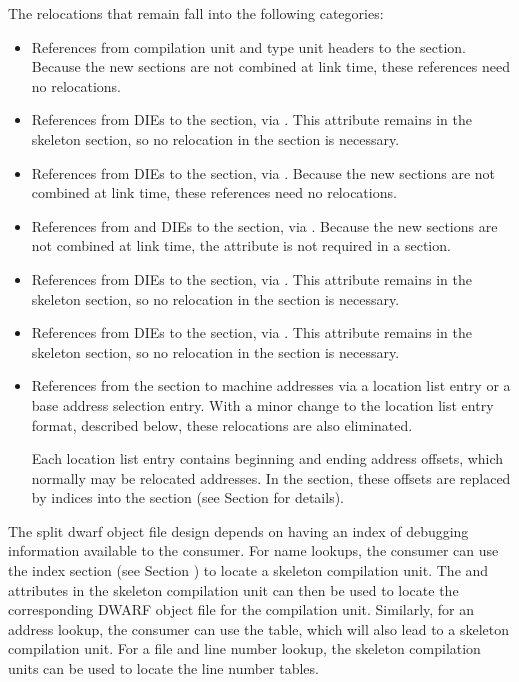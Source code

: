The relocations that remain fall into the following categories:
\begin{itemize}
\item
References from compilation unit and type unit headers to the
\dotdebugabbrevdwo{} section. Because the new sections are not
combined at link time, these references need no relocations.
\item
References from \DWTAGcompileunit{} DIEs to the
\dotdebuglinedwo{} section, via \DWATstmtlist{}. This attribute
remains in the skeleton \dotdebuginfo{} section, so no
relocation in the \dotdebuginfodwo{} section is necessary.
\item
References from \DWTAGtypeunit{} DIEs to the 
\dotdebuglinedwo{} section, via \DWATstmtlist{}. Because the new
sections are not combined at link time, these references need
no relocations.
\item
References from \DWTAGcompileunit{} and \DWTAGtypeunit{} DIEs
to the \dotdebugstroffsetsdwo{} section, via
\DWATstroffsetsbase{}. Because the new sections are not
combined at link time, the \DWATstroffsetsbase{} attribute
is not required in a \dotdebuginfodwo{}
section.
\item
References from \DWTAGcompileunit{} DIEs to the \dotdebugaddr{}
section, via \DWATaddrbase{}. This attribute remains in
the skeleton \dotdebuginfo{} section, so no relocation in the
\dotdebuginfodwo{} section is necessary.
\item
References from \DWTAGcompileunit{} DIEs to the \dotdebugranges{}
section, via \DWATrangesbase{}. This attribute remains in
the skeleton \dotdebuginfo{} section, so no relocation in the
\dotdebuginfodwo{} section is necessary.
\item
References from the \dotdebuglocdwo{} section to machine addresses
via a location list entry or a base address selection entry.
With a minor change to the location list entry format,
described below, these relocations are also eliminated.

Each location list entry contains beginning and ending address
offsets, which normally may be relocated addresses. In the
\dotdebuglocdwo{} section, these offsets are replaced by indices
into the \dotdebugaddr{} section (see Section 
 for details). 
\end{itemize}

The split dwarf object file design depends on having an index of 
debugging information available to the consumer. For name lookups, 
the consumer can use the \dotdebugnames{} index section (see 
Section ) to 
locate a skeleton compilation unit. The
\DWATcompdir{} and \DWATdwoname{} attributes in the skeleton
compilation unit can then be used to locate the corresponding
DWARF object file for the compilation unit. Similarly, for an
address lookup, the consumer can use the \dotdebugaranges{} table,
which will also lead to a skeleton compilation unit. For a file
and line number lookup, the skeleton compilation units can be
used to locate the line number tables.

